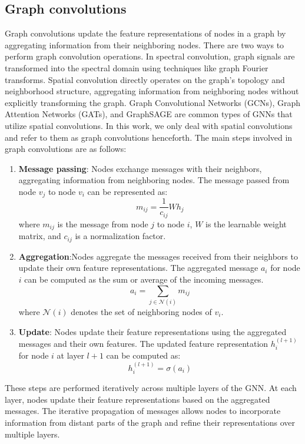 \subsection{Graph convolutions}
Graph convolutions update the feature representations of nodes in a graph by aggregating information from their neighboring nodes. There are two ways to perform graph convolution operations. In spectral convolution, graph signals are transformed into the spectral domain using techniques like graph Fourier transforms. Spatial convolution directly operates on the graph's topology and neighborhood structure, aggregating information from neighboring nodes without explicitly transforming the graph. Graph Convolutional Networks (GCNs), Graph Attention Networks (GATs), and GraphSAGE are common types of GNNs that utilize spatial convolutions. In this work, we only deal with spatial convolutions and refer to them as graph convolutions henceforth. The main steps involved in graph convolutions are as follows:
\begin{enumerate}
    \item \textbf{Message passing}: Nodes exchange messages with their neighbors, aggregating information from neighboring nodes. The message passed from node $v_j$ to node $v_i$ can be represented as:
        \[ m_{ij} = \frac{1}{c_{ij}} W h_j \]
        where $m_{ij}$ is the message from node $j$ to node $i$, $W$ is the learnable weight matrix, and $c_{ij}$ is a normalization factor.
    
    \item \textbf{Aggregation}:Nodes aggregate the messages received from their neighbors to update their own feature representations. The aggregated message $a_i$ for node $i$ can be computed as the sum or average of the incoming messages.
        \[ a_i = \sum_{j \in \mathcal{N}(i)} m_{ij} \]
    where $\mathcal{N}(i)$ denotes the set of neighboring nodes of $v_i$.
    \item \textbf{Update}: Nodes update their feature representations using the aggregated messages and their own features. The updated feature representation $h_i^{(l+1)}$ for node $i$ at layer $l+1$ can be computed as:
        \[ h_i^{(l+1)} = \sigma(a_i) \]
\end{enumerate}
These steps are performed iteratively across multiple layers of the GNN. At each layer, nodes update their feature representations based on the aggregated messages. The iterative propagation of messages allows nodes to incorporate information from distant parts of the graph and refine their representations over multiple layers. \\
